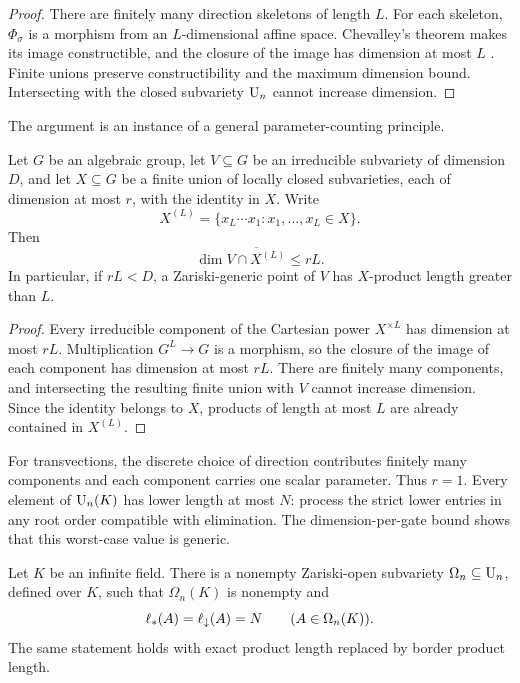 \begin{proof}
There are finitely many direction skeletons of length $L$.  For each skeleton, $\Phi_\sigma$ is a morphism from an $L$-dimensional affine space.  Chevalley's theorem makes its image constructible, and the closure of the image has dimension at most $L$ \cite{Hartshorne1977}.  Finite unions preserve constructibility and the maximum dimension bound.  Intersecting with the closed subvariety $\operatorname{U}_n$ cannot increase dimension.
\end{proof}

The argument is an instance of a general parameter-counting principle.

\begin{proposition}\label{prop:dimension-per-gate}
Let $G$ be an algebraic group, let $V\subseteq G$ be an irreducible subvariety of dimension $D$, and let $X\subseteq G$ be a finite union of locally closed subvarieties, each of dimension at most $r$, with the identity in $X$.  Write
\[
X^{(L)}
=
\{x_L\cdots x_1:x_1,\ldots,x_L\in X\}.
\]
Then
\[
\dim\overline{V\cap X^{(L)}}\le rL.
\]
In particular, if $rL<D$, a Zariski-generic point of $V$ has $X$-product length greater than $L$.
\end{proposition}

\begin{proof}
Every irreducible component of the Cartesian power $X^{\times L}$ has dimension at most $rL$.  Multiplication $G^L\to G$ is a morphism, so the closure of the image of each component has dimension at most $rL$.  There are finitely many components, and intersecting the resulting finite union with $V$ cannot increase dimension.  Since the identity belongs to $X$, products of length at most $L$ are already contained in $X^{(L)}$.
\end{proof}

For transvections, the discrete choice of direction contributes finitely many components and each component carries one scalar parameter.  Thus $r=1$.  Every element of $\operatorname{U}_n(K)$ has lower length at most $N$: process the strict lower entries in any root order compatible with elimination.  The dimension-per-gate bound shows that this worst-case value is generic.

\begin{theorem}\label{thm:generic-rigidity}
Let $K$ be an infinite field.  There is a nonempty Zariski-open subvariety $\Omega_n\subseteq\operatorname{U}_n$, defined over $K$, such that $\Omega_n(K)$ is nonempty and
\[
\ell_{*}(A)=\ell_{\downarrow}(A)=N
\qquad(A\in\Omega_n(K)).
\]
The same statement holds with exact product length replaced by border product length.
\end{theorem}

